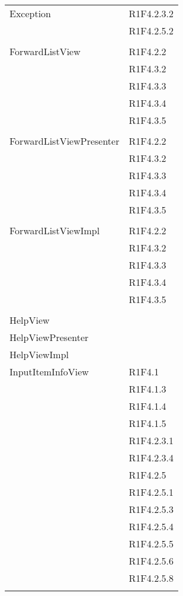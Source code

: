 \begin{center}
\begin{longtable}{|p{7cm}|p{7cm}|}
		Exception & R1F4.2.3.2 \\ & R1F4.2.5.2 \\ & \\ \hline
		ForwardListView & R1F4.2.2 \\ & R1F4.3.2 \\ & R1F4.3.3 \\ & R1F4.3.4 \\ & R1F4.3.5 \\ & \\ \hline
		ForwardListViewPresenter & R1F4.2.2 \\ & R1F4.3.2 \\ & R1F4.3.3 \\ & R1F4.3.4 \\ & R1F4.3.5 \\ & \\ \hline
		ForwardListViewImpl & R1F4.2.2 \\ & R1F4.3.2 \\ & R1F4.3.3 \\ & R1F4.3.4 \\ & R1F4.3.5 \\ & \\ \hline
		HelpView & \\ \hline
		HelpViewPresenter & \\ \hline
		HelpViewImpl & \\ \hline
		InputItemInfoView & R1F4.1 \\ & R1F4.1.3 \\ & R1F4.1.4 \\ & R1F4.1.5 \\ & R1F4.2.3.1 \\ & R1F4.2.3.4 \\ & R1F4.2.5 \\ & R1F4.2.5.1 \\ & R1F4.2.5.3 \\ & R1F4.2.5.4 \\ & R1F4.2.5.5 \\ & R1F4.2.5.6 \\ & R1F4.2.5.8 \\ & \\ \hline

\end{longtable}
\end{center}
